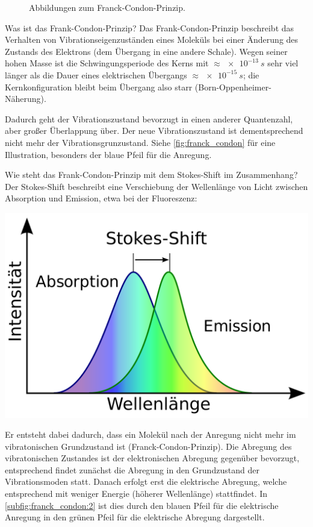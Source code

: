 \begin{figure}[tb!]
    \caption{Abbildungen zum Franck-Condon-Prinzip. }
    \label{fig:franck_condon}
\end{figure}

\begin{fquestion}{Was ist das Frank-Condon-Prinzip?}
    Das Frank-Condon-Prinzip beschreibt das Verhalten von Vibrationseigenzuständen eines Moleküls bei einer Änderung des Zustands des Elektrons (dem Übergang in eine andere Schale).
    Wegen seiner hohen Masse ist die Schwingungsperiode des Kerns mit $\approx \SI{e-13}{s}$ sehr viel länger als die Dauer eines elektrischen Übergangs $\approx \SI{e-15}{s}$; die Kernkonfiguration bleibt beim Übergang also starr (Born-Oppenheimer-Näherung).
    
    Dadurch geht der Vibrationszustand bevorzugt in einen anderer Quantenzahl, aber großer Überlappung über.
    Der neue Vibrationszustand ist dementsprechend nicht mehr der Vibrationsgrunzustand.
    Siehe \autoref{fig:franck_condon} für eine Illustration, besonders der blaue Pfeil für die Anregung.
\end{fquestion}

\begin{fquestion}{Wie steht das Frank-Condon-Prinzip mit dem Stokes-Shift im Zusammenhang?}
    Der Stokes-Shift beschreibt eine Verschiebung der Wellenlänge von Licht zwischen Absorption und Emission, etwa bei der Fluoreszenz:
    \begin{center}
        \includegraphics[width=0.4\linewidth]{img/1280px-Stokes-Verschiebung.svg.png}
    \end{center}
    Er entsteht dabei dadurch, dass ein Molekül nach der Anregung nicht mehr im vibratonischen Grundzustand ist (Franck-Condon-Prinzip).
    Die Abregung des vibratonischen Zustandes ist der elektronischen Abregung gegenüber bevorzugt, entsprechend findet zunächst die Abregung in den Grundzustand der Vibrationsmoden statt.
    Danach erfolgt erst die elektrische Abregung, welche entsprechend mit weniger Energie (höherer Wellenlänge) stattfindet.
    In \autoref{subfig:franck_condon:2} ist dies durch den blauen Pfeil für die elektrische Anregung in den grünen Pfeil für die elektrische Abregung dargestellt.
\end{fquestion}

